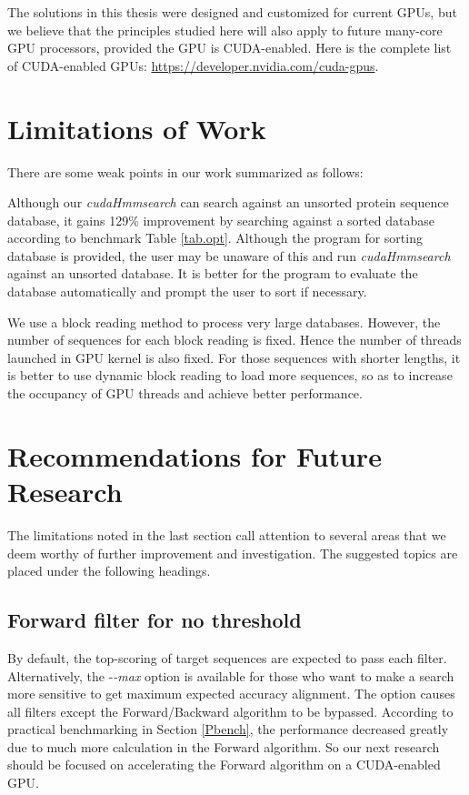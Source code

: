 The solutions in this thesis were designed and customized for current GPUs, but we believe that the principles studied here will also apply to future many-core GPU processors, provided the GPU is CUDA-enabled. Here is the complete list of CUDA-enabled GPUs: \url{https://developer.nvidia.com/cuda-gpus}.


\section{Limitations of Work}
There are some weak points in our work summarized as follows:

Although our \emph{cudaHmmsearch} can search against an unsorted protein sequence database, it gains 129\% improvement by searching against a sorted database according to benchmark Table \ref{tab.opt}. Although the program for sorting database is provided, the user may be unaware of this and run \emph{cudaHmmsearch} against an unsorted database. It is better for the program to evaluate the database automatically and prompt the user to sort if necessary.

We use a block reading method to process very large databases. However, the number of sequences for each block reading is fixed. Hence the number of threads launched in GPU kernel is also fixed. For those sequences with shorter lengths, it is better to use dynamic block reading to load more sequences, so as to increase the occupancy of GPU threads and achieve better performance.


\section{Recommendations for Future Research}
The limitations noted in the last section call attention to several areas that we deem worthy of further improvement and investigation. The suggested topics are placed under the following headings.

\subsection*{Forward filter for no threshold}
By default, the top-scoring of target sequences are expected to pass each filter. Alternatively, the -\emph{-max} option is available for those who want to make a search more sensitive to get maximum expected accuracy alignment. The option causes all filters except the Forward/Backward algorithm to be bypassed. According to practical benchmarking in Section \ref{Pbench}, the performance decreased greatly due to much more calculation in the Forward algorithm. So our next research should be focused on accelerating the Forward algorithm on a CUDA-enabled GPU.


